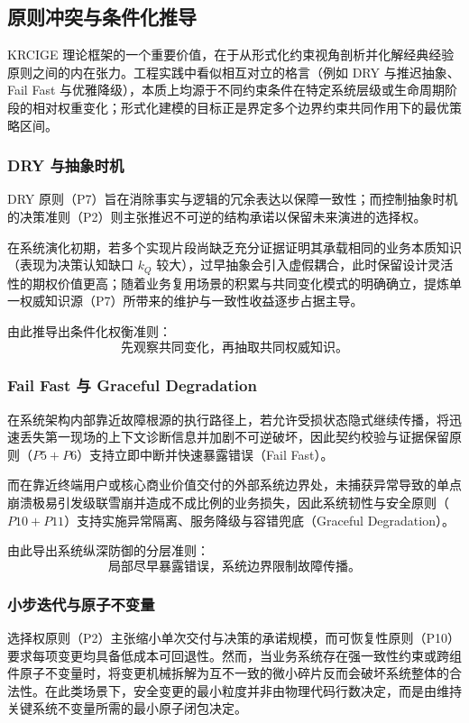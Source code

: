 \documentclass[11pt,a4paper]{ctexart}
\numberwithin{equation}{section}
\theoremstyle{definition}
\theoremstyle{plain}
\begin{document}
\subsection{原则冲突与条件化推导}

KRCIGE 理论框架的一个重要价值，在于从形式化约束视角剖析并化解经典经验原则之间的内在张力。工程实践中看似相互对立的格言（例如 DRY 与推迟抽象、Fail Fast 与优雅降级），本质上均源于不同约束条件在特定系统层级或生命周期阶段的相对权重变化；形式化建模的目标正是界定多个边界约束共同作用下的最优策略区间。

\subsubsection{DRY 与抽象时机}

DRY 原则（P7）旨在消除事实与逻辑的冗余表达以保障一致性；而控制抽象时机的决策准则（P2）则主张推迟不可逆的结构承诺以保留未来演进的选择权。

在系统演化初期，若多个实现片段尚缺乏充分证据证明其承载相同的业务本质知识（表现为决策认知缺口 $k_Q$ 较大），过早抽象会引入虚假耦合，此时保留设计灵活性的期权价值更高；随着业务复用场景的积累与共同变化模式的明确确立，提炼单一权威知识源（P7）所带来的维护与一致性收益逐步占据主导。

由此推导出条件化权衡准则：
\[
\boxed{
\text{先观察共同变化，再抽取共同权威知识。}
}
\]

\subsubsection{Fail Fast 与 Graceful Degradation}

在系统架构内部靠近故障根源的执行路径上，若允许受损状态隐式继续传播，将迅速丢失第一现场的上下文诊断信息并加剧不可逆破坏，因此契约校验与证据保留原则（$P5+P6$）支持立即中断并快速暴露错误（Fail Fast）。

而在靠近终端用户或核心商业价值交付的外部系统边界处，未捕获异常导致的单点崩溃极易引发级联雪崩并造成不成比例的业务损失，因此系统韧性与安全原则（$P10+P11$）支持实施异常隔离、服务降级与容错兜底（Graceful Degradation）。

由此导出系统纵深防御的分层准则：
\[
\boxed{
\text{局部尽早暴露错误，系统边界限制故障传播。}
}
\]

\subsubsection{小步迭代与原子不变量}

选择权原则（P2）主张缩小单次交付与决策的承诺规模，而可恢复性原则（P10）要求每项变更均具备低成本可回退性。然而，当业务系统存在强一致性约束或跨组件原子不变量时，将变更机械拆解为互不一致的微小碎片反而会破坏系统整体的合法性。在此类场景下，安全变更的最小粒度并非由物理代码行数决定，而是由维持关键系统不变量所需的最小原子闭包决定。
\end{document}
